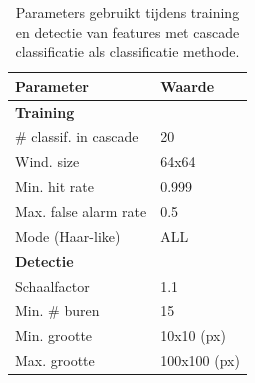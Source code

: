 \begin{table}

	\centering
  	\begin{tabular}{@{}ll@{}} \toprule
    Parameter & Waarde\\ \midrule
    \textbf{Training} & \\ 
    \# classif. in cascade & 20 \\
    Wind. size & 64x64 \\
    Min. hit rate & 0.999 \\
    Max. false alarm rate & 0.5 \\
    Mode (Haar-like) & ALL \\ \midrule
    \textbf{Detectie} & \\ %
    Schaalfactor & 1.1 \\
    Min. \# buren & 15 \\
    Min. grootte & 10x10 (px) \\
    Max. grootte & 100x100 (px) \\ \bottomrule
  \end{tabular}
  \caption{Parameters gebruikt tijdens training en detectie van features met cascade classificatie als classificatie methode.}
  \label{tab:param_ccla}
\end{table}


